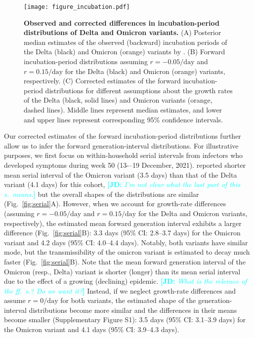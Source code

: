 \documentclass[12pt]{article}
\newcommand{\comment}{\showcomment}
\newcommand{\showcomment}[3]{\textcolor{#1}{\textbf{[#2: }\textsl{#3}\textbf{]}}}
\newcommand{\jd}[1]{\comment{cyan}{JD}{#1}}
\newcommand{\fref}[1]{Fig.~\ref{fig:#1}}
\begin{document}
\begin{figure}[!th]
\texttt{[image: figure\_incubation.pdf]}
\caption{
\textbf{Observed and corrected differences in incubation-period distributions of Delta and Omicron variants.}
(A) Posterior median estimates of the observed (backward) incubation periods of the Delta (black) and Omicron (orange) variants by \cite{backer2021omicron}.
(B) Forward incubation-period distributions assuming $r=-0.05/\mathrm{day}$ and $r=0.15/\mathrm{day}$ for the Delta (black) and Omicron (orange) variants, respectively.
(C) Corrected estimates of the forward incubation-period distributions for different assumptions about the growth rates of the Delta (black, solid lines) and Omicron variants (orange, dashed lines).
Middle lines represent median estimates, and lower and upper lines represent corresponding 95\% confidence intervals.
\label{fig:incubation}
}
\end{figure}

Our corrected estimates of the forward incubation-period distributions further allow us to infer the forward generation-interval distributions.
For illustrative purposes, we first focus on within-household serial intervals from infectors who developed symptoms during week 50 (13-–19 December, 2021).
\citep{backer2021omicron} reported shorter mean serial interval of the Omicron variant (3.5 days) than that of the Delta variant (4.1 days) for this cohort,
\jd{I'm not clear what the last part of this s.~means.} but the overall shapes of the distributions are similar (\fref{serial}A).
However, when we account for growth-rate differences (assuming $r=-0.05/\mathrm{day}$ and $r=0.15/\mathrm{day}$ for the Delta and Omicron variants, respectively), the estimated mean forward generation interval exhibits a larger difference (\fref{serial}B): 3.3 days (95\% CI: 2.8--3.7 days) for the Omicron variant and 4.2 days (95\% CI: 4.0--4.4 days).
Notably, both variants have similar mode, but the transmissibility of the omicron variant is estimated to decay much faster (\fref{serial}B).
Note that the mean forward generation interval of the Omicron (resp., Delta) variant is shorter (longer) than its mean serial interval due to the effect of a growing (declining) epidemic.
\jd{What is the relevace of the ff.~s.? Do we want it?}
Instead, if we neglect growth-rate differences and assume $r= 0/\mathrm{day}$ for both variants, the estimated shape of the generation-interval distributions become more similar and the differences in their means become smaller (Supplementary Figure S1): 3.5 days (95\% CI: 3.1--3.9 days) for the Omicron variant and 4.1 days (95\% CI: 3.9--4.3 days).
\end{document}
